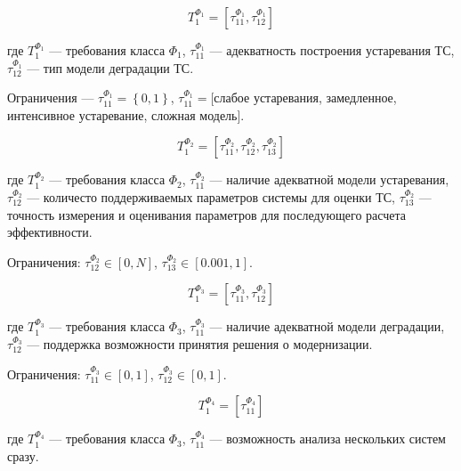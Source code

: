 \begin{equation}
    \label{eq:formal_requirements_1}
    T^{\Phi_1}_1=[\tau^{\Phi_1}_{11},\tau^{\Phi_1}_{12}]
\end{equation}
\vspace{0.5em}

\noindent
где $T^{\Phi_1}_1$ --- требования класса $\Phi_1$,
$\tau^{\Phi_1}_{11}$ --- адекватность построения устаревания ТС,
$\tau^{\Phi_1}_{12}$ --- тип модели деградации ТС.

Ограничения --- $\tau^{\Phi_1}_{11} = \left\{ 0,1 \right\}$,
$\tau^{\Phi_1}_{11} = $[слабое устаревания, замедленное, интенсивное устаревание, сложная модель].

\begin{equation}
    \label{eq:formal_requirements_2}
    T^{\Phi_2}_1=[\tau^{\Phi_2}_{11},\tau^{\Phi_2}_{12},\tau^{\Phi_2}_{13}]
\end{equation}
\vspace{0.5em}

\noindent
где $T^{\Phi_2}_1$ --- требования класса $\Phi_2$,
$\tau^{\Phi_2}_{11}$ --- наличие адекватной модели устаревания,
$\tau^{\Phi_2}_{12}$ --- количесто поддерживаемых параметров системы для оценки ТС,
$\tau^{\Phi_2}_{13}$ --- точность измерения и оценивания параметров для последующего расчета эффективности.

Ограничения: $\tau^{\Phi_2}_{12} \in [0,N]$,
$\tau^{\Phi_2}_{13} \in [0.001,1]$.

\begin{equation}
    \label{eq:formal_requirements_3}
    T^{\Phi_3}_1=[\tau^{\Phi_3}_{11},\tau^{\Phi_3}_{12}]
\end{equation}
\vspace{0.5em}

\noindent
где $T^{\Phi_3}_1$ --- требования класса $\Phi_3$,
$\tau^{\Phi_3}_{11}$ --- наличие адекватной модели деградации,
$\tau^{\Phi_3}_{12}$ --- поддержка возможности принятия решения о модернизации.

Ограничения: $\tau^{\Phi_3}_{11} \in [0,1]$,
$\tau^{\Phi_3}_{12} \in [0,1]$.

\begin{equation}
    \label{eq:formal_requirements_4}
    T^{\Phi_4}_1=[\tau^{\Phi_4}_{11}]
\end{equation}
\vspace{0.5em}

\noindent
где $T^{\Phi_4}_1$ --- требования класса $\Phi_3$,
$\tau^{\Phi_4}_{11}$ --- возможность анализа нескольких систем сразу.

